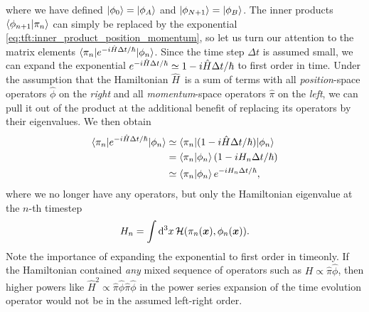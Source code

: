 where we have defined $\ket{\phi_0} = \ket{\phi_A}$ and $\ket{\phi_{N+1}} = \ket{\phi_B}$.
The inner products $\braket{\phi_{n+1} | \pi_n}$ can simply be replaced by the exponential \eqref{eq:tft:inner_product_position_momentum}, so let us turn our attention to the matrix elements $\braket{\pi_n | e^{- i \hat{H} \Delta t / \hbar} | \phi_n}$.
Since the time step $\Delta t$ is assumed small, we can expand the exponential $e^{- i \hat{H} \Delta t / \hbar} \simeq 1 - i \hat{H} \Delta t / \hbar$ to first order in time.
Under the assumption that the Hamiltonian $\hat{H}$ is a sum of terms with all \emph{position}-space operators $\hat{\phi}$ on the \emph{right} and all \emph{momentum}-space operators $\hat{\pi}$ on the \emph{left}, we can pull it out of the product at the additional benefit of replacing its operators by their eigenvalues.
We then obtain
\begin{equation}
\begin{split}
	\braket{\pi_n | e^{- i \hat{H} \Delta t / \hbar} | \phi_n} &\simeq \braket{\pi_n | (1 - i \hat{H} \Delta t / \hbar) | \phi_n} \\
	                                                   &=       \braket{\pi_n | \phi_n} (1 - i H_n \Delta t / \hbar) \\
	                                                   &\simeq \braket{\pi_n | \phi_n} e^{- i H_n \Delta t / \hbar}, \\
\end{split}
\label{eq:tft:path_integral_hamiltonian_assumption}
\end{equation}
where we no longer have any operators, but only the Hamiltonian eigenvalue at the $n$-th timestep
\begin{equation}
	H_n = \int \mathop{}\!\mathrm{d}^3 x \, \mathcal{H}(\pi_n({\bm{x}}), \phi_n({\bm{x}})) .
\label{eq:tft:hamiltonian_eigenvalues}
\end{equation}
Note the importance of expanding the exponential to first order in timeonly.
If the Hamiltonian contained \emph{any} mixed sequence of operators such as $H \propto \hat{\pi} \hat{\phi}$, then higher powers like $\hat{H}^2 \propto \hat{\pi} \hat{\phi} \hat{\pi} \hat{\phi}$ in the power series expansion of the time evolution operator would not be in the assumed left-right order.


